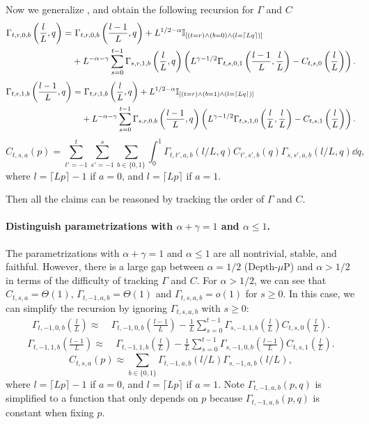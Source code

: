 \documentclass{article}
\theoremstyle{plain}
\theoremstyle{definition}
\begin{document}
Now we generalize , and obtain the following recursion for $\Gamma$ and $C$
\begin{align*} 
     \Gamma_{t,r,0,b}\left(\frac l L, q\right) = &~\Gamma_{t,r,0,b}\left(\frac{l-1}L, q\right) + L^{1/2-\alpha}\mathbb{I}_{[(t=r) \wedge (b=0) \wedge (l=\lceil L q\rceil)]} \\
     & + L^{-\alpha-\gamma} \sum_{s=0}^{t-1} \Gamma_{s,r,1,b}\left(\frac l L, q\right)\left(L^{\gamma-1/2}\Gamma_{t,s,0,1}\left(\frac{l-1}L, \frac l L\right)-C_{t,s,0}\left(\frac l L\right)\right).
    \end{align*}
    \begin{align*} 
     \Gamma_{t,r,1,b}\left(\frac {l-1} L, q\right) = &~\Gamma_{t,r,1,b}\left(\frac{l}L, q\right) + L^{1/2-\alpha} \mathbb{I}_{[(t=r) \wedge (b=1) \wedge (l=\lceil L q\rceil)]} \\
     & + L^{-\alpha-\gamma} \sum_{s=0}^{t-1} \Gamma_{s,r,0,b}\left(\frac {l-1} L, q\right)\left(L^{\gamma -1/2}\Gamma_{t,s,1,0}\left(\frac{l}L, \frac l L\right)-C_{t,s,1}\left(\frac l L\right)\right).
     \end{align*}
     \[C_{t,s,a}(p)=\sum_{t'=-1}^{t}\sum_{s'=-1}^{s}\sum_{b\in\{0,1\}}\int_0^1 \Gamma_{t,t',a,b}(l/L,q) C_{t',s',b}(q)\Gamma_{s,s',a,b}(l/L,q) \dd q,\] where $l=\lceil Lp\rceil -1$ if $a=0$, and  $l=\lceil Lp\rceil$ if $a=1$.

Then all the claims can be reasoned by tracking the order of $\Gamma$ and $C$.
\paragraph{Distinguish parametrizations with $\alpha+\gamma=1$ and $\alpha\leq 1$. } The parametrizations with $\alpha+\gamma=1$ and $\alpha\leq 1$ are all nontrivial, stable, and faithful. However, there is a large gap between $\alpha=1/2$ (Depth-$\mu$P) and $\alpha > 1/2$ in terms of the difficulty of tracking $\Gamma$ and $C$. For $\alpha > 1/2$, we can see that
$C_{t,s,a}=\Theta(1)$, $\Gamma_{t,-1,a,b}=\Theta(1)$ and $\Gamma_{t,s,a,b}=o(1)$ for $s\geq 0$. In this case, we can simplify the recursion by ignoring $\Gamma_{t,s,a,b}$ with $s\geq 0$: 
\begin{align*} 
     \Gamma_{t,-1,0,b}\left(\frac l L\right) \approx &~\Gamma_{t,-1,0,b}\left(\frac{l-1}L\right) - \frac1L \sum_{s=0}^{t-1} \Gamma_{s,-1,1,b}\left(\frac l L\right)C_{t,s,0}\left(\frac l L\right).
    \end{align*}
    \begin{align*} 
     \Gamma_{t,-1,1,b}\left(\frac {l-1} L\right) \approx &~\Gamma_{t,-1,1,b}\left(\frac{l}L\right)  - \frac1L \sum_{s=0}^{t-1} \Gamma_{s,-1,0,b}\left(\frac {l-1} L\right)C_{t,s,1}\left(\frac l L\right).
     \end{align*}
     \[C_{t,s,a}(p)\approx\sum_{b\in\{0,1\}} \Gamma_{t,-1,a,b}(l/L) \Gamma_{s,-1,a,b}(l/L),\] where $l=\lceil Lp\rceil -1$ if $a=0$, and  $l=\lceil Lp\rceil$ if $a=1$. Note $\Gamma_{t,-1,a,b}(p,q)$ is simplified to a function that only depends on $p$ because $\Gamma_{t,-1, a,b}(p, q)$ is constant when fixing $p$. 
\end{document}
